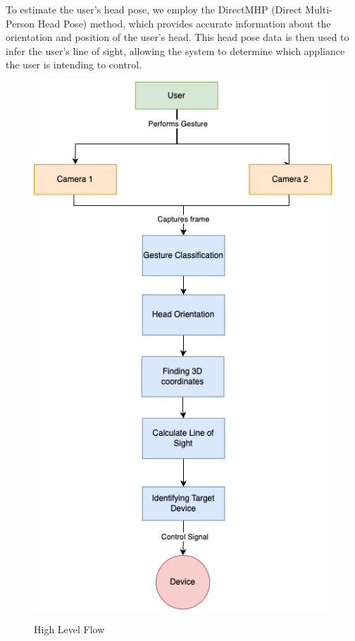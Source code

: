 To estimate the user's head pose, we employ the DirectMHP (Direct Multi-Person Head Pose) method, which provides accurate information about the orientation and position of the user's head. This head pose data is then used to infer the user's line of sight, allowing the system to determine which appliance the user is intending to control.
\vspace{0.3cm}
\begin{figure}[!t]
	\centering
	\includegraphics[scale=0.4]{images/basic_flow.png} \\
	\caption{High Level Flow}
	\label{fig: High Level Flow}
\end{figure}

